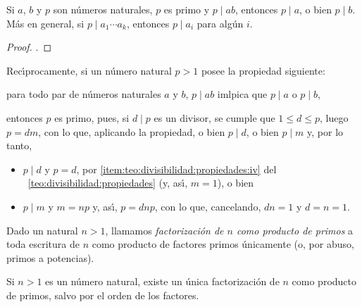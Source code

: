 \begin{lemaPrimos}\label{lema:primos}
	Si $a$, $b$ y $p$ son n\'umeros naturales, $p$ es primo y $p\mid ab$,
	entonces $p\mid a$, o bien $p\mid b$. M\'as en general, si
	$p\mid a_1\cdots a_k$, entonces $p\mid a_i$ para alg\'un $i$.
\end{lemaPrimos}

\begin{proof}
	\quedacomoejercicio.%
\end{proof}

\begin{obsPrimos}\label{obs:primos:irreducibles}
	Rec\'{\i}procamente, si un n\'umero natural $p>1$ posee la propiedad
	siguiente:
	\begin{center}
		para todo par de n\'umeros naturales $a$ y $b$,
		$p\mid ab$ imlpica que $p\mid a$ o $p\mid b$,
	\end{center}
	entonces $p$ es primo, pues, si $d\mid p$ es un divisor, se cumple
	que $1\leq d\leq p$, luego $p=dm$, con lo que, aplicando la propiedad,
	o bien $p\mid d$, o bien $p\mid m$ y, por lo tanto,
	\begin{itemize}
		\item $p\mid d$ y $p=d$, por
			\eqref{item:teo:divisibilidad:propiedades:iv} del
			\teoname~\ref{teo:divisibilidad:propiedades}
			(y, as\'{\i}, $m=1$), o bien
		\item $p\mid m$ y $m=np$ y, as\'{\i}, $p=dnp$, con lo que,
			cancelando, $dn=1$ y $d=n=1$.
	\end{itemize}
\end{obsPrimos}

\begin{defPrimos}\label{def:factorizacion}
	Dado un natural $n>1$, llamamos \emph{factorizaci\'on de $n$ como %
	producto de primos} a toda escritura de $n$ como producto de factores
	primos \'unicamente (o, por abuso, primos a potencias).
\end{defPrimos}

\begin{teoPrimos}%
	\label{teo:fundamental}
	Si $n>1$ es un n\'umero natural, existe un \'unica factorizaci\'on de
	$n$ como producto de primos, salvo por el orden de los factores.
\end{teoPrimos}

